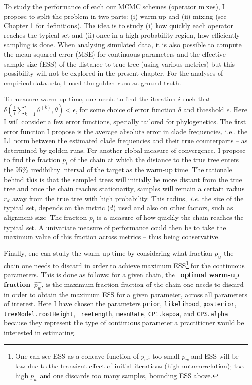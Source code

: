 To study the performance of each our MCMC schemes (operator mixes), I propose to split the problem in two parts: (i) warm-up and (ii) mixing (see Chapter 1 for definitions).
The idea is to study (i) how quickly each operator reaches the typical set and (ii) once in a high probability region, how efficiently sampling is done.
When analysing simulated data, it is also possible to compute the mean squared error (MSE) for continuous parameters and the effective sample size (ESS) of the  distance to true tree (using various metrics) but this possibility will not be explored in the present chapter.
For the analyses of empirical data sets, I used the golden runs as ground truth.

To measure warm-up time, one needs to find the iteration $i$ such that $\delta(\frac{1}{i}\sum_{k=1}^i\theta^{(k)}, \theta) < \epsilon$, for some choice of error function $\delta$ and threshold $\epsilon$.
Here I will consider a few error functions, specially tailored for phylogenetics.
The first error function I propose is the average absolute error in clade frequencies, i.e., the L1 norm between the estimated clade frequencies and their true counterparts -- as determined by golden runs.
For another global measure of convergence, I propose to find the fraction $p_t$ of the chain at which the distance to the true tree enters the 95\% credibility interval of the target as the warm-up time.
The rationale behind this is that the sampled trees will initially be more distant from the true tree and  once the chain reaches stationarity, samples will remain a certain radius $r_d$ away from the true tree with high probability.
This radius,~\textit{i.e.} the size of the typical set, depends on the metric ($d$) used and also on other factors, such as alignment size.
The fraction $p_t$ is a measure of how quickly the chain reaches the typical set.
A univariate measure of performance could then be to take the maximum value of this fraction across metrics -- thus being conservative.

Finally, one can study the warm-up time by considering what fraction $p_w$ the chain one needs to discard in order to achieve maximum ESS\footnote{One can see ESS as a concave function of $p_w$; too small $p_w$ and ESS will be low due to the transient effect of initial iterations (high autocorrelation); too high $p_w$ and one discards too many samples, bounding ESS above.} for the continuous parameters.
This is done as follows: for a given chain, the~\textbf{ optimal warm-up fraction}, $\hat{p_w}$, is the maximum fraction fraction of the chain one needs to discard in order to obtain the maximum ESS for a given parameter, across all parameters of interest.
Here I have chosen the parameters \verb|prior|, \verb|likelihood|, \verb|posterior|, \verb|treeModel.rootHeight|, \verb|treeLength|, \verb|meanRate|, \verb|CP1.kappa|, and  \verb|CP3.alpha| because they represent the type of continuous parameter a practitioner would be interested in estimating.

